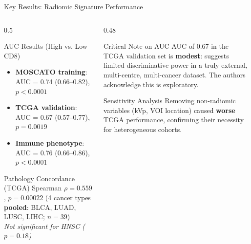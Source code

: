 \documentclass[aspectratio=1610]{beamer}
\begin{document}
\begin{frame}{Key Results: Radiomic Signature Performance}
    \begin{columns}[T]
        \begin{column}{0.5\textwidth}
            \begin{block}{AUC Results (High vs. Low CD8)}
                \begin{itemize}
                    \item \textbf{MOSCATO training}: AUC = 0.74 (0.66--0.82), $p < 0.0001$
                    \item \textbf{TCGA validation}: AUC = 0.67 (0.57--0.77), $p = 0.0019$
                    \item \textbf{Immune phenotype}: AUC = 0.76 (0.66--0.86), $p < 0.0001$
                \end{itemize}
            \end{block}
            \begin{block}{Pathology Concordance (TCGA)}
                Spearman $\rho = 0.559$, $p = 0.00022$ (4 cancer types \textbf{pooled}: BLCA, LUAD, LUSC, LIHC; $n=39$)\\
                \textit{Not significant for HNSC ($p=0.18$)}
            \end{block}
        \end{column}
        \begin{column}{0.48\textwidth}
            \begin{alertblock}{Critical Note on AUC}
                AUC of 0.67 in the TCGA validation set is \textbf{modest}: suggests limited discriminative power in a truly external, multi-centre, multi-cancer dataset. The authors acknowledge this is exploratory.
            \end{alertblock}
            \vspace{0.3em}
            \begin{exampleblock}{Sensitivity Analysis}
                Removing non-radiomic variables (kVp, VOI location) caused \textbf{worse} TCGA performance, confirming their necessity for heterogeneous cohorts.
            \end{exampleblock}
        \end{column}
    \end{columns}
\end{frame}
\end{document}

